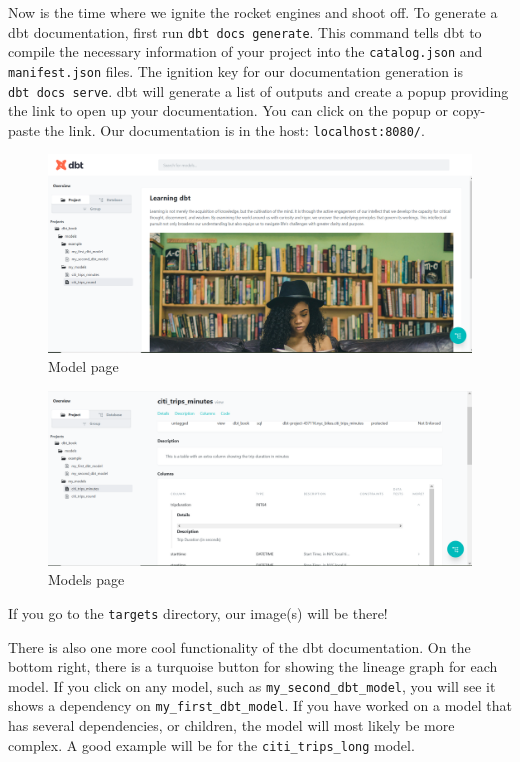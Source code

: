 \documentclass[
]{book}
\begin{document}
Now is the time where we ignite the rocket engines and shoot off. To generate a dbt documentation, first run \texttt{dbt\ docs\ generate}. This command tells dbt to compile the necessary information of your project into the \texttt{catalog.json} and \texttt{manifest.json} files. The ignition key for our documentation generation is \texttt{dbt\ docs\ serve}. dbt will generate a list of outputs and create a popup providing the link to open up your documentation. You can click on the popup or copy-paste the link. Our documentation is in the host: \texttt{localhost:8080/}.

\begin{figure}
\centering
\includegraphics{./images/overview_page.png}
\caption{Model page}
\end{figure}

\begin{figure}
\centering
\includegraphics{./images/model_page.png}
\caption{Models page}
\end{figure}

If you go to the \texttt{targets} directory, our image(s) will be there!

There is also one more cool functionality of the dbt documentation. On the bottom right, there is a turquoise button for showing the lineage graph for each model. If you click on any model, such as \texttt{my\_second\_dbt\_model}, you will see it shows a dependency on \texttt{my\_first\_dbt\_model}. If you have worked on a model that has several dependencies, or children, the model will most likely be more complex. A good example will be for the \texttt{citi\_trips\_long} model.
\end{document}
